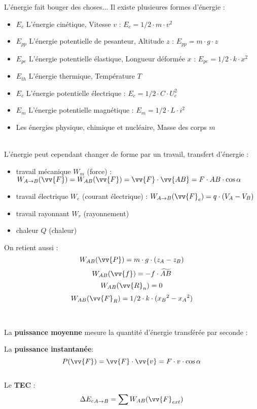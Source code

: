 \documentclass[../MAIN/main.tex]{subfiles}
\begin{document}
\begin{Definition}
L'énergie fait bouger des choses... Il existe plusieures formes d'énergie :
\begin{itemize}
\item $E_{c}$ L'énergie cinétique, Vitesse $v$ : $E_{c} = 1/2 \cdot m \cdot v^2 $
\item $E_{pp}$ L'énergie potentielle de pesanteur, Altitude $z$ : $E_{pp} = m \cdot g \cdot z$
\item $E_{pe}$ L'énergie potentielle élastique, Longueur déformée $x$ : $E_{pe} = 1/2 \cdot k \cdot x^2$
\item $E_{th}$ L'énergie thermique, Température $T$ 
\item $E_{c}$ L'énergie potentielle électrique : $E_{c} = 1/2 \cdot C \cdot U_{c}^2$
\item $E_{m}$ L'énergie potentielle magnétique : $E_{m} = 1/2 \cdot L \cdot i^2$
\item Les énergies physique, chimique et nucléaire, Masse des corps $m$\\\\
\end{itemize}

L'énergie peut cependant changer de forme par un travail, transfert d'énergie :
\begin{itemize}
\item travail mécanique $W_{m}$ (force) : $W_{A\rightarrow B}(\vv{F}) = W_{AB}(\vv{F}) = \vv{F}\cdot\vv{AB} = F \cdot AB \cdot \cos{\alpha} $
\item travail électrique $W_{e}$ (courant électrique) : $W_{A\rightarrow B}(\vv{F}_{e}) = q \cdot (V_{A}-V_{B})$
\item travail rayonnant $W_{r}$ (rayonnement)
\item chaleur $Q$ (chaleur)
\end{itemize}

On retient aussi :
$$W_{AB}(\vv{P}) = m\cdot g \cdot (z_{A}-z_{B})$$
$$W_{AB}(\vv{f}) = - f \cdot \widetilde{AB} $$
$$W_{AB}(\vv{R}_{n}) = 0$$
$$W_{AB}(\vv{F}_{R}) = 1/2 \cdot k \cdot ({x_{B}}^2 -{x_{A}}^2)$$\\\\

La \textbf{puissance moyenne} mesure la quantité d'énergie transférée par seconde :


La \textbf{puissance instantanée}:
$$P(\vv{F}) = \vv{F}\cdot \vv{v} = F\cdot v \cdot \cos{\alpha}$$\\

Le \textbf{TEC} :
$$\Delta {E_{c}}_{A\rightarrow B} = \sum W_{AB}(\vv{F}_{ext})$$

\end{Definition}
\end{document}
